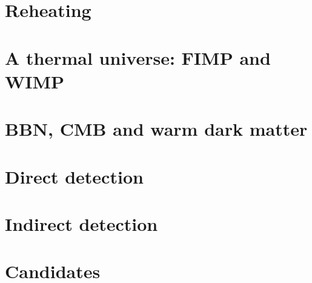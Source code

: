 \documentclass[a4paper]{book}
\theoremstyle{definition}
\theoremstyle{remark}
\begin{document}
\chapter{Reheating}

\chapter{A thermal universe: FIMP and WIMP}

\chapter{BBN, CMB and warm dark matter}

\chapter{Direct detection}

\chapter{Indirect detection}

\chapter{Candidates}
\end{document}
